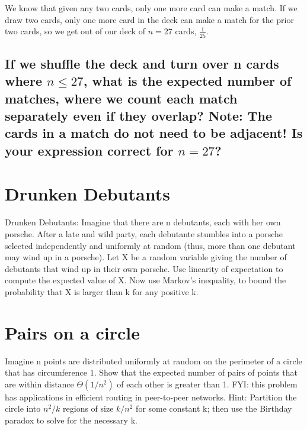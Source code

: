 \documentclass[titlepage]{article}\usepackage[]{graphicx}\usepackage[]{color}
\begin{document}
We know that given any two cards, only one more card can make a match. If we
draw two cards, only one more card in the deck can make a match for the prior
two cards, so we get out of our deck of $n=27$ cards, $\frac{1}{25}$.

\subsection{ If we shuffle the deck and turn over n cards where $n ≤ 27$, what
is the expected number of matches, where we count each match
separately even if they overlap? Note: The cards in a match do
not need to be adjacent! Is your expression correct for $n = 27$?}







  \section{ Drunken Debutants}
Drunken Debutants: Imagine that there are n debutants, each with her own
porsche. After a late and wild party, each debutante stumbles into a porsche
selected independently and uniformly at random (thus, more than one debutant
may wind up in a porsche). Let X be a random variable giving the number of
debutants that wind up in their own porsche. Use linearity of expectation to
compute the expected value of X. Now use Markov’s inequality, to bound the
probability that X is larger than k for any positive k.







  \section{ Pairs on a circle}
Imagine n points are distributed uniformly at random on the perimeter of a
circle that has circumference 1. Show that the expected number of pairs of
points that are within distance $\Theta(1/n^2)$ of each other is greater than 1. FYI:
this problem has applications in efficient routing in peer-to-peer networks.
Hint: Partition the circle into $n^2/k$ regions of size $k/n^2$ for some constant
k; then use the Birthday paradox to solve for the necessary k.

  
\end{document}
